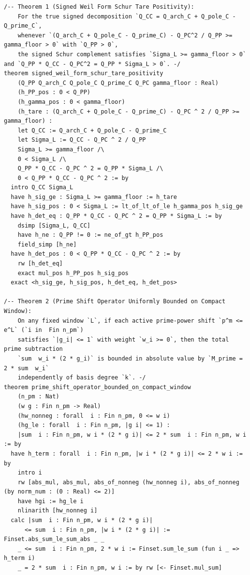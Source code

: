 \documentclass[11pt,a4paper]{article}
\begin{document}
\begin{lstlisting}[language=Lean4]
/-- Theorem 1 (Signed Weil Form Schur Tare Positivity):
    For the true signed decomposition `Q_CC = Q_arch_C + Q_pole_C - Q_prime_C`,
    whenever `(Q_arch_C + Q_pole_C - Q_prime_C) - Q_PC^2 / Q_PP >= gamma_floor > 0` with `Q_PP > 0`,
    the signed Schur complement satisfies `Sigma_L >= gamma_floor > 0` and `Q_PP * Q_CC - Q_PC^2 = Q_PP * Sigma_L > 0`. -/
theorem signed_weil_form_schur_tare_positivity
    (Q_PP Q_arch_C Q_pole_C Q_prime_C Q_PC gamma_floor : Real)
    (h_PP_pos : 0 < Q_PP)
    (h_gamma_pos : 0 < gamma_floor)
    (h_tare : (Q_arch_C + Q_pole_C - Q_prime_C) - Q_PC ^ 2 / Q_PP >= gamma_floor) :
    let Q_CC := Q_arch_C + Q_pole_C - Q_prime_C
    let Sigma_L := Q_CC - Q_PC ^ 2 / Q_PP
    Sigma_L >= gamma_floor /\
    0 < Sigma_L /\
    Q_PP * Q_CC - Q_PC ^ 2 = Q_PP * Sigma_L /\
    0 < Q_PP * Q_CC - Q_PC ^ 2 := by
  intro Q_CC Sigma_L
  have h_sig_ge : Sigma_L >= gamma_floor := h_tare
  have h_sig_pos : 0 < Sigma_L := lt_of_lt_of_le h_gamma_pos h_sig_ge
  have h_det_eq : Q_PP * Q_CC - Q_PC ^ 2 = Q_PP * Sigma_L := by
    dsimp [Sigma_L, Q_CC]
    have h_ne : Q_PP != 0 := ne_of_gt h_PP_pos
    field_simp [h_ne]
  have h_det_pos : 0 < Q_PP * Q_CC - Q_PC ^ 2 := by
    rw [h_det_eq]
    exact mul_pos h_PP_pos h_sig_pos
  exact <h_sig_ge, h_sig_pos, h_det_eq, h_det_pos>

/-- Theorem 2 (Prime Shift Operator Uniformly Bounded on Compact Window):
    On any fixed window `L`, if each active prime-power shift `p^m <= e^L` (`i in  Fin n_pm`)
    satisfies `|g_i| <= 1` with weight `w_i >= 0`, then the total prime subtraction
    `sum  w_i * (2 * g_i)` is bounded in absolute value by `M_prime = 2 * sum  w_i`
    independently of basis degree `k`. -/
theorem prime_shift_operator_bounded_on_compact_window
    (n_pm : Nat)
    (w g : Fin n_pm -> Real)
    (hw_nonneg : forall  i : Fin n_pm, 0 <= w i)
    (hg_le : forall  i : Fin n_pm, |g i| <= 1) :
    |sum  i : Fin n_pm, w i * (2 * g i)| <= 2 * sum  i : Fin n_pm, w i := by
  have h_term : forall  i : Fin n_pm, |w i * (2 * g i)| <= 2 * w i := by
    intro i
    rw [abs_mul, abs_mul, abs_of_nonneg (hw_nonneg i), abs_of_nonneg (by norm_num : (0 : Real) <= 2)]
    have hgi := hg_le i
    nlinarith [hw_nonneg i]
  calc |sum  i : Fin n_pm, w i * (2 * g i)|
      <= sum  i : Fin n_pm, |w i * (2 * g i)| := Finset.abs_sum_le_sum_abs _ _
    _ <= sum  i : Fin n_pm, 2 * w i := Finset.sum_le_sum (fun i _ => h_term i)
    _ = 2 * sum  i : Fin n_pm, w i := by rw [<- Finset.mul_sum]


\end{lstlisting}
\end{document}
